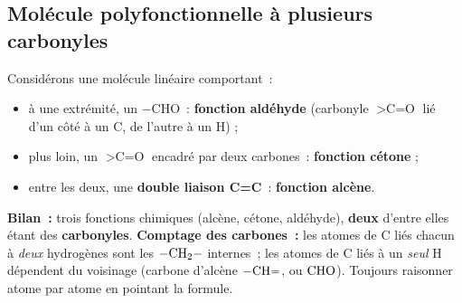 \documentclass[11pt,a4paper]{article}
\begin{document}
\subsection{Molécule polyfonctionnelle à plusieurs carbonyles}
\begin{exemple}
Considérons une molécule linéaire comportant~:
\begin{itemize}[leftmargin=1.6em,itemsep=1pt]
  \item à une extrémité, un $-\text{CHO}$~: \textbf{fonction aldéhyde} (carbonyle $>\text{C=O}$ lié d'un côté à un C, de l'autre à un H) ;
  \item plus loin, un $>\text{C=O}$ encadré par deux carbones~: \textbf{fonction cétone} ;
  \item entre les deux, une \textbf{double liaison C=C}~: \textbf{fonction alcène}.
\end{itemize}
\textbf{Bilan~:} trois fonctions chimiques (alcène, cétone, aldéhyde), \textbf{deux} d'entre elles étant des \textbf{carbonyles}. \textbf{Comptage des carbones~:} les atomes de C liés chacun à \emph{deux} hydrogènes sont les $\ce{-CH2-}$ internes~; les atomes de C liés à un \emph{seul} H dépendent du voisinage (carbone d'alcène $\ce{-CH=}$, ou $\ce{CHO}$). Toujours raisonner atome par atome en pointant la formule.
\end{exemple}

\end{document}
